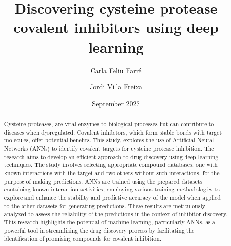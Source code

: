 \documentclass[final,times,twocolumn,article]{elsarticle}
\begin{document}
\begin{frontmatter}



\title{Discovering cysteine protease covalent inhibitors using deep learning}


\author[first]{Carla Feliu Farré}
\author[second]{Jordi Villa Freixa}
\date{September 2023}

\begin{abstract}
Cysteine proteases, are vital enzymes to biological processes but can contribute to diseases when dysregulated. Covalent inhibitors, which form stable bonds with target molecules, offer potential benefits. This study, explores the use of Artificial Neural Networks (ANNs) to identify covalent targets for cysteine protease inhibition. The research aims to develop an efficient approach to drug discovery using deep learning techniques. 
The study involves selecting appropriate compound databases, one with known interactions with the target and two others without such interactions, for the purpose of making predictions. ANNs are trained using the prepared datasets containing known interaction activities, employing various training methodologies to explore and enhance the stability and predictive accuracy of the model when applied to the other datasets for generating predictions. These results are meticulously analyzed to assess the reliability of the predictions in the context of inhibitor discovery. 
This research highlights the potential of machine learning, particularly ANNs, as a powerful tool in streamlining the drug discovery process by facilitating the identification of promising compounds for covalent inhibition.



\end{abstract}
\end{frontmatter}
\end{document}
